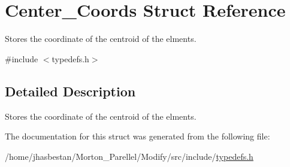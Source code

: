 \hypertarget{structCenter__Coords}{
\section{Center\_\-Coords Struct Reference}
\label{structCenter__Coords}
}


Stores the coordinate of the centroid of the elments.  


{\ttfamily \#include $<$typedefs.h$>$}

\subsection{Detailed Description}
Stores the coordinate of the centroid of the elments. 

The documentation for this struct was generated from the following file:\begin{DoxyCompactItemize}
\item 
/home/jhasbestan/Morton\_\-Parellel/Modify/src/include/\hyperlink{typedefs_8h}{typedefs.h}\end{DoxyCompactItemize}
